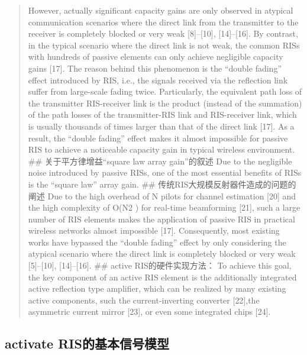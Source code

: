 \documentclass[UTF8]{ctexart}
\begin{document}
\begin{quote}
However, actually significant capacity gains are only observed in
atypical communication scenarios where the direct link from the
transmitter to the receiver is completely blocked or very weak
{[}8{]}--{[}10{]}, {[}14{]}--{[}16{]}. By contrast, in the typical
scenario where the direct link is not weak, the common RISs with
hundreds of passive elements can only achieve negligible capacity gains
{[}17{]}. The reason behind this phenomenon is the ``double fading''
effect introduced by RIS, i.e., the signals received via the reflection
link suffer from large-scale fading twice. Particularly, the equivalent
path loss of the transmitter RIS-receiver link is the product (instead
of the summation) of the path losses of the transmitter-RIS link and
RIS-receiver link, which is usually thousands of times larger than that
of the direct link {[}17{]}. As a result, the ``double fading'' effect
makes it almost impossible for passive RIS to achieve a noticeable
capacity gain in typical wireless environment. \#\#
关于平方律增益``square law array gain''的叙述 Due to the negligible
noise introduced by passive RISs, one of the most essential benefits of
RISs is the ``square law'' array gain. \#\#
传统RIS大规模反射器件造成的问题的阐述 Due to the high overhead of N
pilots for channel estimation {[}20{]} and the high complexity of O(N2 )
for real-time beamforming {[}21{]}, such a large number of RIS elements
makes the application of passive RIS in practical wireless networks
almost impossible {[}17{]}. Consequently, most existing works have
bypassed the ``double fading'' effect by only considering the atypical
scenario where the direct link is completely blocked or very weak
{[}5{]}--{[}10{]}, {[}14{]}--{[}16{]}. \#\# active RIS的硬件实现方法：
To achieve this goal, the key component of an active RIS element is the
additionally integrated active reflection type amplifier, which can be
realized by many existing active components, such the current-inverting
converter {[}22{]},the asymmetric current mirror {[}23{]}, or even some
integrated chips {[}24{]}.
\end{quote}

\hypertarget{activate-risux7684ux57faux672cux4fe1ux53f7ux6a21ux578b}{%
\subsection{activate
RIS的基本信号模型}\label{activate-risux7684ux57faux672cux4fe1ux53f7ux6a21ux578b}}
\end{document}
